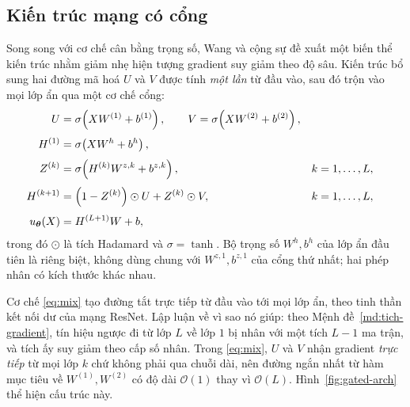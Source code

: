 \subsection{Kiến trúc mạng có cổng}
\label{subsec:gated}
 
Song song với cơ chế cân bằng trọng số, Wang và cộng sự đề xuất một biến thể kiến
trúc nhằm giảm nhẹ hiện tượng gradient suy giảm theo độ sâu. Kiến trúc bổ sung
hai đường mã hoá $U$ và $V$ được tính \emph{một lần} từ đầu vào, sau đó trộn vào
mọi lớp ẩn qua một cơ chế cổng:
\begin{align}
U &= \sigma\!\left(X W^{(1)} + b^{(1)}\right),
\qquad
V = \sigma\!\left(X W^{(2)} + b^{(2)}\right),
\label{eq:encoders}\\[3pt]
H^{(1)} &= \sigma\!\left(X W^{h} + b^{h}\right),
\label{eq:first-hidden}\\[3pt]
Z^{(k)} &= \sigma\!\left(H^{(k)} W^{z,k} + b^{z,k}\right),
&& k = 1, \dots, L,
\label{eq:gate}\\[3pt]
H^{(k+1)} &= \left(1 - Z^{(k)}\right) \odot U + Z^{(k)} \odot V,
&& k = 1, \dots, L,
\label{eq:mix}\\[3pt]
u_{\bm{\theta}}(X) &= H^{(L+1)} W + b,
\label{eq:output-improved}
\end{align}
trong đó $\odot$ là tích Hadamard và $\sigma = \tanh$. Bộ trọng số $W^{h}, b^{h}$
của lớp ẩn đầu tiên là riêng biệt, không dùng chung với $W^{z,1}, b^{z,1}$ của
cổng thứ nhất; hai phép nhân có kích thước khác nhau.
 
Cơ chế \eqref{eq:mix} tạo đường tắt trực tiếp từ đầu vào tới mọi lớp ẩn, theo
tinh thần kết nối dư của mạng ResNet. Lập luận về vì sao nó giúp: theo
Mệnh đề~\ref{md:tich-gradient}, tín hiệu ngược đi từ lớp $L$ về lớp $1$ bị nhân
với một tích $L-1$ ma trận, và tích ấy suy giảm theo cấp số nhân. Trong
\eqref{eq:mix}, $U$ và $V$ nhận gradient \emph{trực tiếp} từ mọi lớp $k$ chứ
không phải qua chuỗi dài, nên đường ngắn nhất từ hàm mục tiêu về $W^{(1)},
W^{(2)}$ có độ dài $\mathcal{O}(1)$ thay vì $\mathcal{O}(L)$. Hình~\ref{fig:gated-arch}
thể hiện cấu trúc này.
 
